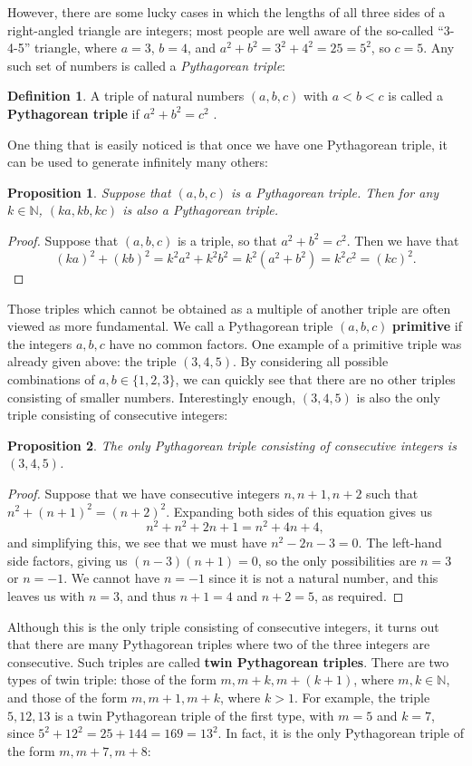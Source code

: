 \documentclass[letterpaper,12pt]{article}
\newtheorem{prop}{Proposition}
\theoremstyle{definition}
\newtheorem{definition}{Definition}
\begin{document}
However, there are some lucky cases in which the lengths of all three sides of a right-angled triangle are integers; most people are well aware of the so-called ``3-4-5'' triangle, where $a=3$, $b=4$, and $a^2+b^2 = 3^2+4^2=25=5^2$, so $c=5$. Any such set of numbers is called a \textit{Pythagorean triple}:
\begin{definition}
 A triple of natural numbers $(a,b,c)$ with $a<b<c$ is called a \textbf{Pythagorean triple} if $a^2+b^2=c^2$ \cite{Su}.
\end{definition}
One thing that is easily noticed is that once we have one Pythagorean triple, it can be used to generate infinitely many others:
\begin{prop}
 Suppose that $(a,b,c)$ is a Pythagorean triple. Then for any $k\in\mathbb{N}$, $(ka,kb,kc)$ is also a Pythagorean triple.
\end{prop}
\begin{proof}
 Suppose that $(a,b,c)$ is a triple, so that $a^2+b^2=c^2$. Then we have that
\[
 (ka)^2+(kb)^2 = k^2a^2+k^2b^2=k^2(a^2+b^2) = k^2c^2 = (kc)^2.
\]
\end{proof}
Those triples which cannot be obtained as a multiple of another triple are often viewed as more fundamental. We call a Pythagorean triple $(a,b,c)$ \textbf{primitive} if the integers $a,b,c$ have no common factors. \cite{WP} One example of a primitive triple was already given above: the triple $(3,4,5)$. By considering all possible combinations of $a,b\in\{1,2,3\}$, we can quickly see that there are no other triples consisting of smaller numbers. Interestingly enough, $(3,4,5)$ is also the only triple consisting of consecutive integers:
\begin{prop}
 The only Pythagorean triple consisting of consecutive integers is $(3,4,5)$.
\end{prop}
\begin{proof}
 Suppose that we have consecutive integers $n,n+1,n+2$ such that $n^2+(n+1)^2=(n+2)^2$. Expanding both sides of this equation gives us
\[
 n^2+n^2+2n+1 = n^2+4n+4,
\]
and simplifying this, we see that we must have $n^2-2n-3=0$. The left-hand side factors, giving us $(n-3)(n+1)=0$, so the only possibilities are $n=3$ or $n=-1$. We cannot have $n=-1$ since it is not a natural number, and this leaves us with $n=3$, and thus $n+1=4$ and $n+2=5$, as required.
\end{proof}
Although this is the only triple consisting of consecutive integers, it turns out that there are many Pythagorean triples where two of the three integers are consecutive. Such triples are called \textbf{twin Pythagorean triples}. \cite{MW} There are two types of twin triple: those of the form $m, m+k, m+(k+1)$, where $m,k\in\mathbb{N}$, and those of the form $m,m+1,m+k$, where $k>1$. For example, the triple $5,12,13$ is a twin Pythagorean triple of the first type, with $m=5$ and $k=7$, since $5^2+12^2 = 25+144 = 169 = 13^2$. In fact, it is the only Pythagorean triple of the form $m,m+7,m+8$:
\end{document}
